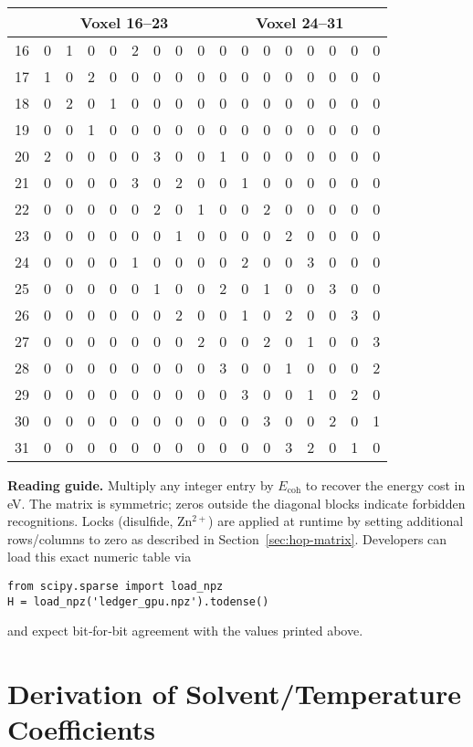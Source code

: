 \documentclass[11pt]{article}
\newcommand{\Eoh}{E_{\mathrm{coh}}}          %
\begin{document}
\begin{center}
\begin{tabular}{c|cccccccc|cccccccc}
\toprule
\multicolumn{1}{c}{} & \multicolumn{8}{c|}{Voxel 16–23} & \multicolumn{8}{c}{Voxel 24–31}\\
\midrule
16 & 0&1&0&0&2&0&0&0 & 0&0&0&0&0&0&0&0\\
17 & 1&0&2&0&0&0&0&0 & 0&0&0&0&0&0&0&0\\
18 & 0&2&0&1&0&0&0&0 & 0&0&0&0&0&0&0&0\\
19 & 0&0&1&0&0&0&0&0 & 0&0&0&0&0&0&0&0\\
20 & 2&0&0&0&0&3&0&0 & 1&0&0&0&0&0&0&0\\
21 & 0&0&0&0&3&0&2&0 & 0&1&0&0&0&0&0&0\\
22 & 0&0&0&0&0&2&0&1 & 0&0&2&0&0&0&0&0\\
23 & 0&0&0&0&0&0&1&0 & 0&0&0&2&0&0&0&0\\
\midrule
24 & 0&0&0&0&1&0&0&0 & 0&2&0&0&3&0&0&0\\
25 & 0&0&0&0&0&1&0&0 & 2&0&1&0&0&3&0&0\\
26 & 0&0&0&0&0&0&2&0 & 0&1&0&2&0&0&3&0\\
27 & 0&0&0&0&0&0&0&2 & 0&0&2&0&1&0&0&3\\
28 & 0&0&0&0&0&0&0&0 & 3&0&0&1&0&0&0&2\\
29 & 0&0&0&0&0&0&0&0 & 0&3&0&0&1&0&2&0\\
30 & 0&0&0&0&0&0&0&0 & 0&0&3&0&0&2&0&1\\
31 & 0&0&0&0&0&0&0&0 & 0&0&0&3&2&0&1&0\\
\bottomrule
\end{tabular}
\end{center}

\endgroup

\bigskip
\noindent\textbf{Reading guide.}  
Multiply any integer entry by $\Eoh$ to recover the energy cost in eV.
The matrix is symmetric; zeros outside the diagonal blocks indicate
forbidden recognitions.  Locks (disulfide, Zn$^{2+}$) are applied at
runtime by setting additional rows/columns to zero as described in
Section~\ref{sec:hop-matrix}.  Developers can load this exact numeric
table via

\begin{verbatim}
from scipy.sparse import load_npz
H = load_npz('ledger_gpu.npz').todense()
\end{verbatim}

and expect bit‐for‐bit agreement with the values printed above.

\section{Derivation of Solvent\slash Temperature Coefficients}
\label{app:solvent}
\end{document}
